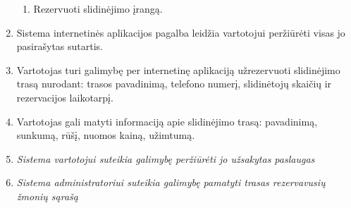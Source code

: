 \documentclass[oneside]{VUMIFPSkursinis}
\begin{document}
\begin{enumerate}
\begin{enumerate}
		\item Rezervuoti slidinėjimo įrangą.
	\end{enumerate}
	\item Sistema internetinės aplikacijos pagalba leidžia vartotojui peržiūrėti visas jo pasirašytas sutartis.
	\item Vartotojas turi galimybę per internetinę aplikaciją užrezervuoti slidinėjimo trasą nurodant: trasos pavadinimą, telefono numerį, slidinėtojų skaičių ir rezervacijos laikotarpį.
	\item Vartotojas gali matyti informaciją apie slidinėjimo trasą: pavadinimą, sunkumą, rūšį, nuomos kainą, užimtumą.
	\item \textit{Sistema vartotojui suteikia galimybę peržiūrėti jo užsakytas paslaugas}
	\item \textit{Sistema administratoriui suteikia galimybę pamatyti trasas rezervavusių žmonių sąrašą}
\end{enumerate}
\end{document}
